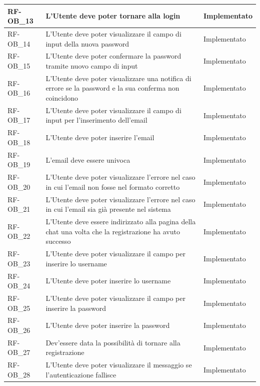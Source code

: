 \begin{longtable}{|>{\raggedright}p{}|>{\raggedright\arraybackslash}p{}|>{\raggedright\arraybackslash}p{}|}
	\hline
	RF-OB\_13 \hypertarget{rf-ob_13} & L'Utente deve poter tornare alla login & Implementato \\
	\hline
	RF-OB\_14 \hypertarget{rf-ob_14} & L'Utente deve poter visualizzare il campo di input della nuova password & Implementato \\
	\hline
	RF-OB\_15 \hypertarget{rf-ob_15} & L'Utente deve poter confermare la password tramite nuovo campo di input & Implementato \\
	\hline
	RF-OB\_16 \hypertarget{rf-ob_16} & L'Utente deve poter visualizzare una notifica di errore se la password e la sua conferma non coincidono & Implementato \\
	\hline
	RF-OB\_17 \hypertarget{rf-ob_17} & L'Utente deve poter visualizzare il campo di input per l'inserimento dell'email & Implementato \\
	\hline
	RF-OB\_18 \hypertarget{rf-ob_18} & L'Utente deve poter inserire l'email & Implementato \\
	\hline
	RF-OB\_19 \hypertarget{rf-ob_19} & L'email deve essere univoca & Implementato \\
	\hline
	RF-OB\_20 \hypertarget{rf-ob_20} & L'Utente deve poter visualizzare l'errore nel caso in cui l'email non fosse nel formato corretto & Implementato \\
	\hline
	RF-OB\_21 \hypertarget{rf-ob_21} & L'Utente deve poter visualizzare l'errore nel caso in cui l'email sia già presente nel sistema & Implementato \\
	\hline
	RF-OB\_22 \hypertarget{rf-ob_22} & L'Utente deve essere indirizzato alla pagina della chat una volta che la registrazione ha avuto successo & Implementato \\
	\hline
	RF-OB\_23 \hypertarget{rf-ob_23} & L'Utente deve poter visualizzare il campo per inserire lo username & Implementato \\
	\hline
	RF-OB\_24 \hypertarget{rf-ob_24} & L'Utente deve poter inserire lo username & Implementato \\
	\hline
	RF-OB\_25 \hypertarget{rf-ob_25} & L'Utente deve poter visualizzare il campo per inserire la password & Implementato \\
	\hline
	RF-OB\_26 \hypertarget{rf-ob_26} & L'Utente deve poter inserire la password & Implementato \\
	\hline
	RF-OB\_27 \hypertarget{rf-ob_27} & Dev'essere data la possibilità di tornare alla registrazione & Implementato \\
	\hline
	RF-OB\_28 \hypertarget{rf-ob_28} & L'Utente deve poter visualizzare il messaggio \vr{Username o password errati} se l'autenticazione fallisce & Implementato \\

\end{longtable}
